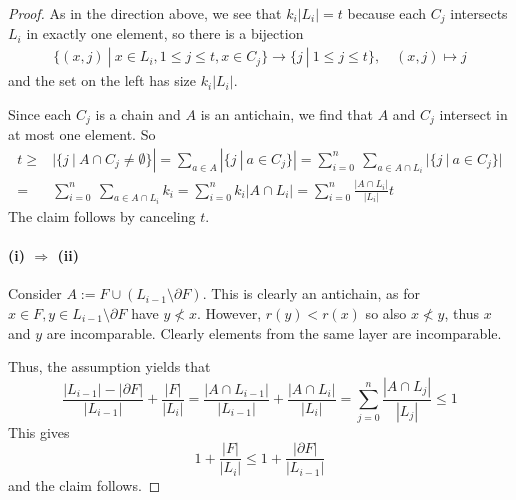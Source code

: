 \documentclass{scrartcl}
\theoremstyle{definition}
\begin{document}
\begin{proof}
    As in the direction above, we see that $k_i |L_i| = t$ because each $C_j$ intersects $L_i$ in exactly one element, so there is a bijection
    \begin{align*}
        \{ (x, j) \ | \ x \in L_i, 1 \leq j \leq t, x \in C_j\} \to \{ j \ | \ 1 \leq j \leq t \}, \quad (x, j) \mapsto j
    \end{align*}
    and the set on the left has size $k_i |L_i|$.

    Since each $C_j$ is a chain and $A$ is an antichain, we find that $A$ and $C_j$ intersect in at most one element.
    So
    \begin{align*}
        t \geq& |\{ j \ | \ A \cap C_j \neq \emptyset \}| = \sum_{a \in A} |\{ j \ | \ a \in C_j \}| = \sum_{i = 0}^n \ \sum_{a \in A \cap L_i} |\{ j \ | \ a \in C_j \}| \\
        =& \sum_{i = 0}^n \ \sum_{a \in A \cap L_i} k_i = \sum_{i = 0}^n k_i |A \cap L_i| = \sum_{i = 0}^n \frac {|A \cap L_i|} {|L_i|} t
    \end{align*}
    The claim follows by canceling $t$.

    \paragraph{(i) $\Rightarrow$ (ii)}
    Consider $A := F \cup (L_{i - 1} \setminus \partial F)$.
    This is clearly an antichain, as for $x \in F, y \in L_{i - 1} \setminus \partial F$ have $y \not< x$.
    However, $r(y) < r(x)$ so also $x \not< y$, thus $x$ and $y$ are incomparable.
    Clearly elements from the same layer are incomparable.

    Thus, the assumption yields that
    \begin{equation*}
        \frac {|L_{i - 1}| - |\partial F|} {|L_{i - 1}|} + \frac {|F|} {|L_i|} = \frac {|A \cap L_{i - 1}|} {|L_{i - 1}|} + \frac {|A \cap L_i|} {|L_i|} = \sum_{j = 0}^n \frac {|A \cap L_j|} {|L_j|} \leq 1
    \end{equation*}
    This gives
    \begin{equation*}
        1 + \frac {|F|} {|L_i|} \leq 1 + \frac {|\partial F|} {|L_{i - 1}|}
    \end{equation*}
    and the claim follows.
\end{proof}
\end{document}
